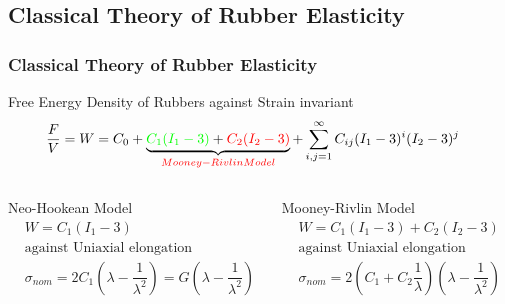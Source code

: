 \documentclass[12pt, dvipdfmx]{beamer}
\begin{document}
\subsection{Classical Theory of Rubber Elasticity}
\begin{frame}
    \frametitle{Classical Theory of Rubber Elasticity}
        \vspace{-2mm}
		\begin{block}{Free Energy Density of Rubbers against Strain invariant}
			\vspace{-6mm}
			\scriptsize
			\begin{align*}
				\dfrac{F}{V} = W 
				&= C_0 + \underbrace{{\color{green}C_1(I_1-3)} + {\color{red}C_2(I_2-3)}}_{\color{red}Mooney-Rivlin Model} + \sum_{i,j = 1}^{\infty} C_{ij}(I_1-3)^i(I_2-3)^j
			\end{align*}  
		\end{block}
		\vspace{-5mm}
		\begin{columns}[T, onlytextwidth]
				\begin{exampleblock}{Neo-Hookean Model}
					\vspace{-6mm}
						\scriptsize
						\begin{align*}
							&W = C_1 (I_1-3) \\
							&\text{against Uniaxial elongation} \\
							&\sigma_{nom} = 2 C_1\left(\lambda - \dfrac{1}{\lambda^2}\right) = G \left(\lambda - \dfrac{1}{\lambda^2}\right)
						\end{align*}
				\end{exampleblock}
				\begin{alertblock}{Mooney-Rivlin Model}
					\vspace{-6mm}
					\scriptsize
					\begin{align*}
						&W = C_1 (I_1-3) + C_2(I_2-3) \\
						&\text{against Uniaxial elongation} \\
						&\sigma_{nom} = 2 \left(C_1 + C_2\dfrac{1}{\lambda} \right) \left(\lambda - \dfrac{1}{\lambda^2}\right)
					\end{align*}
				\end{alertblock}
		\end{columns}
		\vspace{-1mm}

\end{frame}
\end{document}
